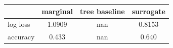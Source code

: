\begin{tabular}{lccc}
\toprule
 & marginal & tree baseline & surrogate \\
\midrule
log loss & 1.0909 & nan & 0.8153 \\
accuracy & 0.433 & nan & 0.640 \\
\bottomrule
\end{tabular}
